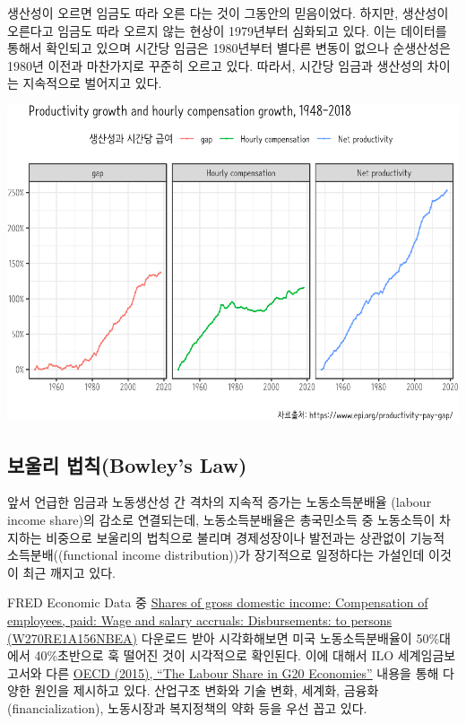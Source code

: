 \documentclass[smallextended]{svjour3}       %
\begin{document}
생산성이 오르면 임금도 따라 오른 다는 것이 그동안의 믿음이었다. 하지만,
생산성이 오른다고 임금도 따라 오르지 않는 현상이 1979년부터 심화되고
있다. 이는 데이터\cite{bivens2014raising}를 통해서 확인되고 있으며
시간당 임금은 1980년부터 별다른 변동이 없으나 순생산성은 1980년 이전과
마찬가지로 꾸준히 오르고 있다. 따라서, 시간당 임금과 생산성의 차이는
지속적으로 벌어지고 있다.

\begin{center}\includegraphics[width=0.77\linewidth]{paper_files/figure-latex/productivity-gap-1} \end{center}

\hypertarget{bowley-law}{%
\subsection{보울리 법칙(Bowley's Law)}\label{bowley-law}}

앞서 언급한 임금과 노동생산성 간 격차의 지속적 증가는 노동소득분배율
(labour income share)의 감소로 연결되는데, 노동소득분배율은 총국민소득
중 노동소득이 차지하는 비중으로 보울리의 법칙으로 불리며 경제성장이나
발전과는 상관없이 기능적 소득분배((functional income distribution))가
장기적으로 일정하다는 가설\cite{lee_2014}인데 이것이 최근 깨지고 있다.

FRED Economic Data 중
\href{https://fred.stlouisfed.org/series/W270RE1A156NBEA}{Shares of
gross domestic income: Compensation of employees, paid: Wage and salary
accruals: Disbursements: to persons (W270RE1A156NBEA)} 다운로드 받아
시각화해보면 미국 노동소득분배율이 50\%대에서 40\%초반으로 훅 떨어진
것이 시각적으로 확인된다. 이에 대해서 ILO 세계임금보고서와 다른
\href{https://www.oecd.org/g20/topics/employment-and-social-policy/The-Labour-Share-in-G20-Economies.pdf}{OECD
(2015), ``The Labour Share in G20 Economies''} 내용을 통해 다양한 원인을
제시하고 있다. 산업구조 변화와 기술 변화, 세계화,
금융화(financialization), 노동시장과 복지정책의 약화 등을 우선 꼽고
있다.
\end{document}
